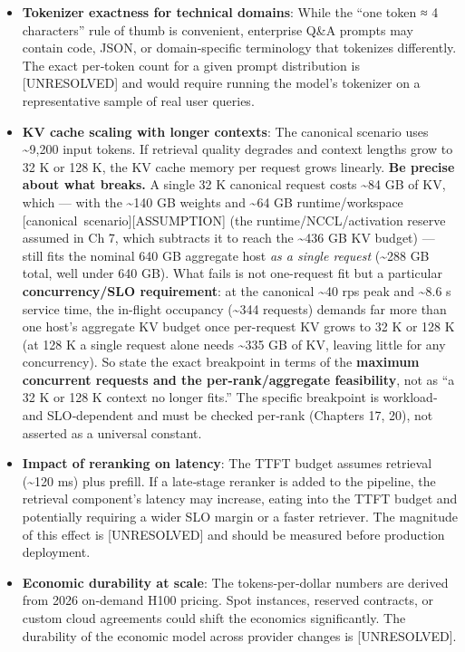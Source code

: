\begin{itemize}
\tightlist
\item
  \textbf{Tokenizer exactness for technical domains}: While the ``one
  token ≈ 4 characters'' rule of thumb is convenient, enterprise Q\&A
  prompts may contain code, JSON, or domain‑specific terminology that
  tokenizes differently. The exact per‑token count for a given prompt
  distribution is \mbox{{[}UNRESOLVED{]}} and would require running the model's
  tokenizer on a representative sample of real user queries.
\item
  \textbf{KV cache scaling with longer contexts}: The canonical scenario
  uses \textasciitilde9,200 input tokens. If retrieval quality degrades
  and context lengths grow to 32 K or 128 K, the KV cache memory per
  request grows linearly. \textbf{Be precise about what breaks.} A
  single 32 K canonical request costs \textasciitilde84 GB of KV, which
  --- with the \textasciitilde140 GB weights and \textasciitilde64 GB
  runtime/workspace \mbox{{[}canonical scenario{]}}\hspace{0pt}\mbox{{[}ASSUMPTION{]}} (the
  runtime/NCCL/activation reserve assumed in Ch 7, which subtracts it to
  reach the \textasciitilde436 GB KV budget) --- still fits the nominal
  640 GB aggregate host \emph{as a single request} (\textasciitilde288
  GB total, well under 640 GB). What fails is not one-request fit but a
  particular \textbf{concurrency/SLO requirement}: at the canonical
  \textasciitilde40 rps peak and \textasciitilde8.6 s service time, the
  in-flight occupancy (\textasciitilde344 requests) demands far more
  than one host's aggregate KV budget once per-request KV grows to 32 K
  or 128 K (at 128 K a single request alone needs \textasciitilde335 GB
  of KV, leaving little for any concurrency). So state the exact
  breakpoint in terms of the \textbf{maximum concurrent requests and the
  per-rank/aggregate feasibility}, not as ``a 32 K or 128 K context no
  longer fits.'' The specific breakpoint is workload‑ and SLO‑dependent
  and must be checked per‑rank (Chapters 17, 20), not asserted as a
  universal constant.
\item
  \textbf{Impact of reranking on latency}: The TTFT budget assumes
  retrieval (\textasciitilde120 ms) plus prefill. If a late‑stage
  reranker is added to the pipeline, the retrieval component's latency
  may increase, eating into the TTFT budget and potentially requiring a
  wider SLO margin or a faster retriever. The magnitude of this effect
  is \mbox{{[}UNRESOLVED{]}} and should be measured before production
  deployment.
\item
  \textbf{Economic durability at scale}: The tokens‑per‑dollar numbers
  are derived from 2026 on‑demand H100 pricing. Spot instances, reserved
  contracts, or custom cloud agreements could shift the economics
  significantly. The durability of the economic model across provider
  changes is \mbox{{[}UNRESOLVED{]}}.
\end{itemize}

